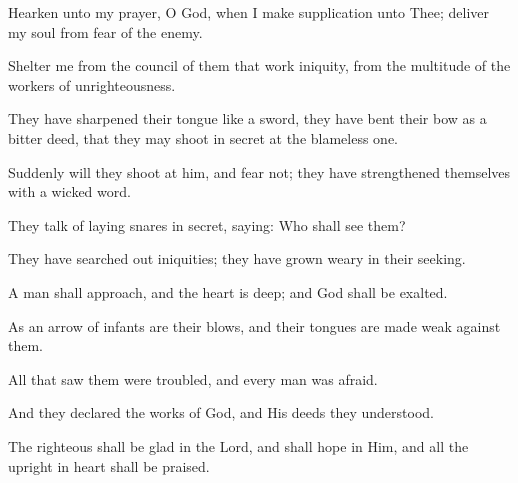 Hearken unto my prayer, O God, when I make supplication unto Thee; deliver my soul from fear of the enemy.

Shelter me from the council of them that work iniquity, from the multitude of the workers of unrighteousness.

They have sharpened their tongue like a sword, they have bent their bow as a bitter deed, that they may shoot in secret at the blameless one.

Suddenly will they shoot at him, and fear not; they have strengthened themselves with a wicked word.

They talk of laying snares in secret, saying: Who shall see them?

They have searched out iniquities; they have grown weary in their seeking.

A man shall approach, and the heart is deep; and God shall be exalted.

As an arrow of infants are their blows, and their tongues are made weak against them.

All that saw them were troubled, and every man was afraid.

And they declared the works of God, and His deeds they understood.

The righteous shall be glad in the Lord, and shall hope in Him, and all the upright in heart shall be praised.
